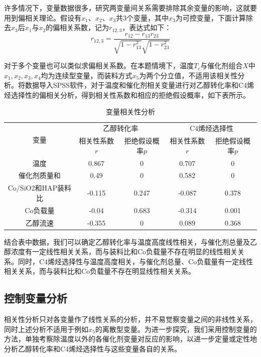 \documentclass{article}
\begin{document}
	许多情况下，变量数据很多，研究两变量间关系需要排除其余变量的影响，这就要用到偏相关理论。假设有$x_1$、$x_2$、$x_3$共3个变量，其中$x_3$为可控变量，下面计算除去$x_3$后$x_1$与$x_2$的偏相关系数，记为$r_{12,3}$，表达式如下：
	\begin{equation}
		r_{12,3}=\frac{r_{12}-r_{13}r_{23}}{\sqrt{1-r_{13}^2}\sqrt{1-r_{23}^2}}
	\end{equation}

	对于多个变量也可以类似求偏相关系数。在本题情境下，温度$T_c$与催化剂组合$X$中$x_1,x_2,x_3,x_4$均为连续型变量，而装料方式$x_5$为两个分立值，不适用该相关性分析。将数据导入SPSS软件，对于温度和催化剂相关变量进行对乙醇转化率和C4烯烃选择性的偏相关分析，得到相关性系数和相应的拒绝假设概率，如下表所示。
	\begin{table}[!h]
		\centering
		\caption{变量相关性分析}
		\begin{tabular}{|c|c|c|c|c|}
			\hline
			\multirow{2}{*}{变量} & \multicolumn{2}{c|}{乙醇转化率} & \multicolumn{2}{c|}{C4烯烃选择性} \\ \cline{2-5} 
			& 相关性系数$r$          & 拒绝假设概率$p$         & 相关性系数$r$           & 拒绝假设概率$p$          \\ \hline
			温度                  & 0.867        & 0           & 0.707         & 0            \\ \hline
			催化剂质量和              & 0.49         & 0           & 0.582         & 0            \\ \hline
			Co/SiO2和HAP装料比      & -0.115       & 0.247       & -0.087        & 0.378        \\ \hline
			Co负载量               & -0.04        & 0.683       & -0.314        & 0.001        \\ \hline
			乙醇流速                & -0.355       & 0           & 0.089         & 0.368        \\ \hline
		\end{tabular}
	\end{table}

	结合表中数据，我们可以确定乙醇转化率与温度高度线性相关，与催化剂总量及乙醇浓度有一定线性相关关系，而与装料比和Co负载量不存在明显的线性相关关系。同时，C4烯烃选择性与温度高度相关，与催化剂总量、Co负载量有一定线性相关关系，而与装料比和Co负载量不存在明显线性相关关系。
	\subsection{控制变量分析}
	相关性分析只对各变量作了线性关系的分析，并不易觉察变量之间的非线性关系，同时上述分析不适用于例如$x_5$的离散型变量。为进一步探究，我们采用控制变量的方法，单独考察除温度以外的各催化剂变量对反应的影响，以进一步定量或定性地分析乙醇转化率和C4烯烃选择性与这些变量各自的关系。
\end{document}
